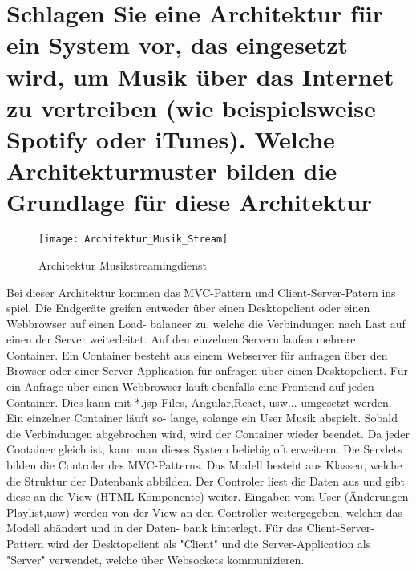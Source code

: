 \documentclass[12pt]{article}
\begin{document}
\section{Schlagen Sie eine Architektur für ein System vor, das eingesetzt wird, um Musik über das Internet zu
vertreiben (wie beispielsweise Spotify oder iTunes). Welche Architekturmuster bilden die Grundlage für
diese Architektur}
\begin{figure}[h]
\begin{center}
\texttt{[image: Architektur\_Musik\_Stream]}
\caption{Architektur Musikstreamingdienst}
\end{center}
\end{figure}
Bei dieser Architektur kommen das MVC-Pattern und Client-Server-Patern ins spiel. Die Endgeräte greifen entweder über einen Desktopclient oder einen Webbrowser auf einen Load- balancer zu, welche die Verbindungen nach Last auf einen der Server weiterleitet. Auf den einzelnen Servern laufen mehrere Container. Ein Container besteht aus einem Webserver für anfragen über den Browser oder einer Server-Application für anfragen über einen Desktopclient. Für ein Anfrage über einen Webbrowser läuft ebenfalls eine Frontend auf jeden Container. Dies kann mit *.jsp Files, Angular,React, usw... umgesetzt werden. Ein einzelner Container läuft so- lange, solange ein User Musik abspielt. Sobald die Verbindungen abgebrochen wird, wird der Container wieder beendet. Da jeder Container gleich ist, kann man dieses System beliebig oft erweitern. Die Servlets bilden die Controler des MVC-Patterns. Das Modell besteht aus Klassen, welche die Struktur der Datenbank abbilden. Der Controler liest die Daten aus und gibt diese an die View (HTML-Komponente) weiter. Eingaben vom User (Änderungen Playlist,usw) werden von der View an den Controller weitergegeben, welcher das Modell abändert und in der Daten- bank hinterlegt.
Für das Client-Server-Pattern wird der Desktopclient als "Client" und die Server-Application als "Server" verwendet, welche über Websockets kommunizieren.
\end{document}
